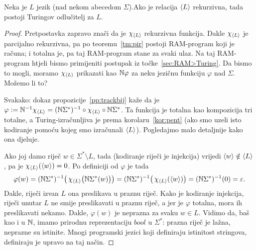 \begin{teorem}[{name=[Turing-odlučivost rekurzivnog jezika]}]\label{tm:krio}
Neka je $L$ jezik (nad nekom abecedom $\Sigma$).\newline Ako je relacija $\langle L\rangle$ rekurzivna, tada postoji Turingov odlučitelj za $L$.
\end{teorem}
\begin{proof}
Pretpostavka zapravo znači da je $\chi_{\langle L\rangle}$ rekurzivna funkcija. Dakle $\chi_{\langle L\rangle}$ je parcijalno rekurzivna, pa po teoremu~\ref{tm:pir} postoji RAM-program koji je računa; i totalna je, pa taj RAM-program stane za svaki ulaz. Na taj RAM-program htjeli bismo primijeniti postupak iz točke~\ref{sec:RAM>Turing}. Da bismo to mogli, moramo $\chi_{\langle L\rangle}$ prikazati kao ${\mathbb N}\varphi$ za neku jezičnu funkciju $\varphi$ nad $\Sigma$. Možemo li to?

Svakako: dokaz propozicije~\ref{pp:trackbij} kaže da je $\varphi:={\mathbb N}^{-1}\chi_{\langle L\rangle}=({\mathbb N}\Sigma^*)^{-1}\circ\chi_{\langle L\rangle}\circ{\mathbb N}\Sigma^*$. Ta funkcija je totalna kao kompozicija tri totalne, a Turing-izračunljiva je prema korolaru~\ref{kor:pent} (ako smo uzeli isto kodiranje pomoću kojeg smo izračunali $\langle L\rangle$). Pogledajmo malo detaljnije kako ona djeluje.

Ako joj damo riječ $w\in\Sigma^*\setminus L$, tada (kodiranje riječi je injekcija) vrijedi $\langle w\rangle\notin\langle L\rangle$, pa je $\chi_{\langle L\rangle}(\langle w\rangle)=0$. Po definiciji od $\varphi$ je tada
\begin{equation}
    \varphi(w)=({\mathbb N}\Sigma^*)^{-1}\bigl(\,\chi_{\langle L\rangle}\bigl({\mathbb N}\Sigma^*(w)\bigr)\bigr)=({\mathbb N}\Sigma^*)^{-1}\bigl(\,\chi_{\langle L\rangle}(\langle w\rangle)\bigr)=({\mathbb N}\Sigma^*)^{-1}(0)=\varepsilon\text.
\end{equation}
Dakle, riječi izvan $L$ ona preslikava u praznu riječ. Kako je kodiranje injekcija, riječi unutar $L$ ne smije preslikavati u praznu riječ, a jer je $\varphi$ totalna, mora ih preslikavati nekamo. Dakle, $\varphi(w)$ je neprazna za svaku $w\in L$.
Vidimo da, baš kao i u ${\mathbb N}$, imamo prirodnu reprezentaciju $bool$ u $\Sigma^*$: prazna riječ je lažna, neprazne su istinite. Mnogi programski jezici koji definiraju istinitost stringova, definiraju je upravo na taj način.



\end{proof}

